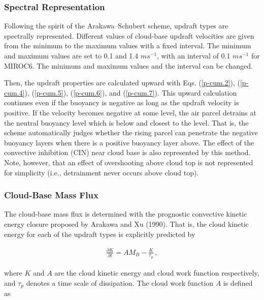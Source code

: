 \hypertarget{spectral-representation}{%
\subsubsection{Spectral Representation}\label{spectral-representation}}

Following the spirit of the Arakawa--Schubert scheme, updraft types are
spectrally represented. Different values of cloud-base updraft
velocities are given from the minimum to the maximum values with a fixed
interval. The minimum and maximum values are set to 0.1 and 1.4
\(m s^{-1}\), with an interval of 0.1 \(m s^{-1}\) for MIROC6. The
minimum and maximum values and the interval can be changed.

Then, the updraft properties are calculated upward with Eqs.
(\ref{p-cum.2}), (\ref{p-cum.4}), (\ref{p-cum.5}),
(\ref{p-cum.6}), and (\ref{p-cum.7}). This upward calculation
continues even if the buoyancy is negative as long as the updraft
velocity is positive. If the velocity becomes negative at some level,
the air parcel detrains at the neutral buoyancy level which is below and
closest to the level. That is, the scheme automatically judges whether
the rising parcel can penetrate the negative buoyancy layers when there
is a positive buoyancy layer above. The effect of the convective
inhibition (CIN) near cloud base is also represented by this method.
Note, however, that an effect of overshooting above cloud top is not
represented for simplicity (i.e., detrainment never occurs above cloud
top).

\hypertarget{cloud-base-mass-flux}{%
\subsubsection{Cloud-Base Mass Flux}\label{cloud-base-mass-flux}}

The cloud-base mass flux is determined with the prognostic convective
kinetic energy closure proposed by Arakawa and Xu (1990). That is, the
cloud kinetic energy for each of the updraft types is explicitly
predicted by

\begin{eqnarray}
 \frac{\partial K}{\partial t} = AM_B - \frac{K}{\tau_p}\,,  \label{p-cum.8}
\end{eqnarray}

where \(K\) and \(A\) are the cloud kinetic energy and cloud work
function respectively, and \(\tau_p\) denotes a time scale of
dissipation. The cloud work function \(A\) is defined as

